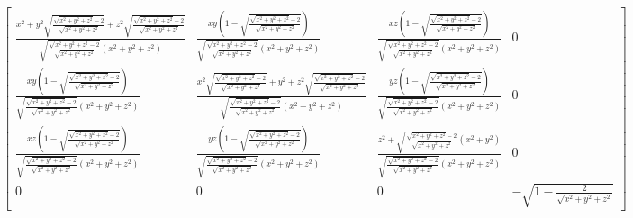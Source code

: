 \begin{equation}\left[\begin{matrix}\frac{x^{2} + y^{2} \sqrt{\frac{\sqrt{x^{2} + y^{2} + z^{2}} - 2}{\sqrt{x^{2} + y^{2} + z^{2}}}} + z^{2} \sqrt{\frac{\sqrt{x^{2} + y^{2} + z^{2}} - 2}{\sqrt{x^{2} + y^{2} + z^{2}}}}}{\sqrt{\frac{\sqrt{x^{2} + y^{2} + z^{2}} - 2}{\sqrt{x^{2} + y^{2} + z^{2}}}} \left(x^{2} + y^{2} + z^{2}\right)} & \frac{x y \left(1 - \sqrt{\frac{\sqrt{x^{2} + y^{2} + z^{2}} - 2}{\sqrt{x^{2} + y^{2} + z^{2}}}}\right)}{\sqrt{\frac{\sqrt{x^{2} + y^{2} + z^{2}} - 2}{\sqrt{x^{2} + y^{2} + z^{2}}}} \left(x^{2} + y^{2} + z^{2}\right)} & \frac{x z \left(1 - \sqrt{\frac{\sqrt{x^{2} + y^{2} + z^{2}} - 2}{\sqrt{x^{2} + y^{2} + z^{2}}}}\right)}{\sqrt{\frac{\sqrt{x^{2} + y^{2} + z^{2}} - 2}{\sqrt{x^{2} + y^{2} + z^{2}}}} \left(x^{2} + y^{2} + z^{2}\right)} & 0\\\frac{x y \left(1 - \sqrt{\frac{\sqrt{x^{2} + y^{2} + z^{2}} - 2}{\sqrt{x^{2} + y^{2} + z^{2}}}}\right)}{\sqrt{\frac{\sqrt{x^{2} + y^{2} + z^{2}} - 2}{\sqrt{x^{2} + y^{2} + z^{2}}}} \left(x^{2} + y^{2} + z^{2}\right)} & \frac{x^{2} \sqrt{\frac{\sqrt{x^{2} + y^{2} + z^{2}} - 2}{\sqrt{x^{2} + y^{2} + z^{2}}}} + y^{2} + z^{2} \sqrt{\frac{\sqrt{x^{2} + y^{2} + z^{2}} - 2}{\sqrt{x^{2} + y^{2} + z^{2}}}}}{\sqrt{\frac{\sqrt{x^{2} + y^{2} + z^{2}} - 2}{\sqrt{x^{2} + y^{2} + z^{2}}}} \left(x^{2} + y^{2} + z^{2}\right)} & \frac{y z \left(1 - \sqrt{\frac{\sqrt{x^{2} + y^{2} + z^{2}} - 2}{\sqrt{x^{2} + y^{2} + z^{2}}}}\right)}{\sqrt{\frac{\sqrt{x^{2} + y^{2} + z^{2}} - 2}{\sqrt{x^{2} + y^{2} + z^{2}}}} \left(x^{2} + y^{2} + z^{2}\right)} & 0\\\frac{x z \left(1 - \sqrt{\frac{\sqrt{x^{2} + y^{2} + z^{2}} - 2}{\sqrt{x^{2} + y^{2} + z^{2}}}}\right)}{\sqrt{\frac{\sqrt{x^{2} + y^{2} + z^{2}} - 2}{\sqrt{x^{2} + y^{2} + z^{2}}}} \left(x^{2} + y^{2} + z^{2}\right)} & \frac{y z \left(1 - \sqrt{\frac{\sqrt{x^{2} + y^{2} + z^{2}} - 2}{\sqrt{x^{2} + y^{2} + z^{2}}}}\right)}{\sqrt{\frac{\sqrt{x^{2} + y^{2} + z^{2}} - 2}{\sqrt{x^{2} + y^{2} + z^{2}}}} \left(x^{2} + y^{2} + z^{2}\right)} & \frac{z^{2} + \sqrt{\frac{\sqrt{x^{2} + y^{2} + z^{2}} - 2}{\sqrt{x^{2} + y^{2} + z^{2}}}} \left(x^{2} + y^{2}\right)}{\sqrt{\frac{\sqrt{x^{2} + y^{2} + z^{2}} - 2}{\sqrt{x^{2} + y^{2} + z^{2}}}} \left(x^{2} + y^{2} + z^{2}\right)} & 0\\0 & 0 & 0 & - \sqrt{1 - \frac{2}{\sqrt{x^{2} + y^{2} + z^{2}}}}\end{matrix}\right]\end{equation}